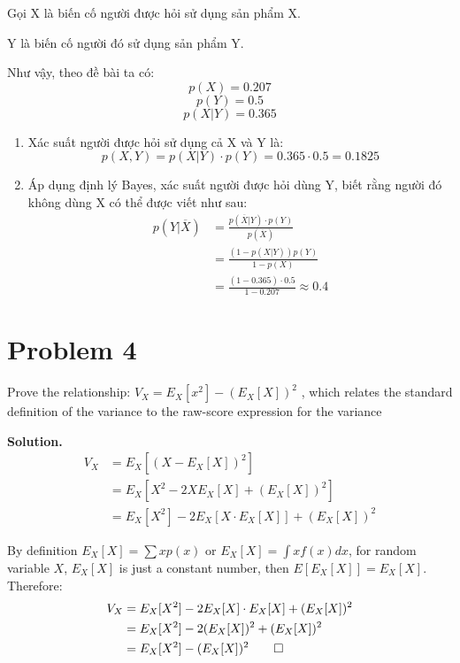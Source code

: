 \documentclass[a4paper, 12pt]{article}  %
\begin{document}
Gọi X là biến cố người được hỏi sử dụng sản phẩm X.

Y là biến cố người đó sử dụng sản phẩm Y.

Như vậy, theo đề bài ta có:
\[p(X) = 0.207 \]
\[p(Y) = 0.5 \]
\[p(X | Y) = 0.365\]

\begin{enumerate}[label=(\alph*)]
    \item Xác suất người được hỏi sử dụng cả X và Y là:
    \[p(X, Y) = p(X|Y) \cdot p(Y) = 0.365 \cdot 0.5 = 0.1825\]
    \item Áp dụng định lý Bayes, xác suất người được hỏi dùng Y, biết rằng người đó không dùng X có thể được viết như sau:
    \begin{align*}
    p(Y|\overline{X}) &= \frac{p(\overline{X}|Y) \cdot p(Y)}{p(\overline{X})}\\
    &= \frac{(1 - p(X|Y)) p(Y)}{1 - p(X)} \\
    &= \frac{(1 - 0.365)\cdot 0.5}{1 - 0.207} \approx 0.4
    \end{align*}
\end{enumerate}


\section{Problem 4} 

Prove the relationship: $V_X = E_X [x^2] - (E_X [X])^2$ , which relates the standard definition of the variance to the raw-score expression for the variance

\textbf{Solution.} 
\begin{align*}
    V_X &=  E_X[(X - E_X [X])^2]\\
    &= E_X [X^2 - 2X E_X [X] + (E_X [X])^2] \\
    &= E_X [X^2] - 2E_X [X \cdot E_X [X]] + (E_X [X])^2
\end{align*}

By definition $E_X [X] = \sum x p(x)$ or $E_X [X] = \int x f(x) dx$, for random variable $X$, $E_X[X]$ is just a constant number, then $E[E_X [X]] = E_X [X]$. Therefore:
\begin{align*}
    V_X &= E_X[X^2] - 2E_X [X] \cdot E_X [X] + (E_X [X])^2 \\
    &= E_X[X^2] - 2 (E_X [X])^2 + (E_X [X])^2 \\
    &= E_X [X^2] - (E_X [X])^2   \qed
\end{align*}

\end{document}

